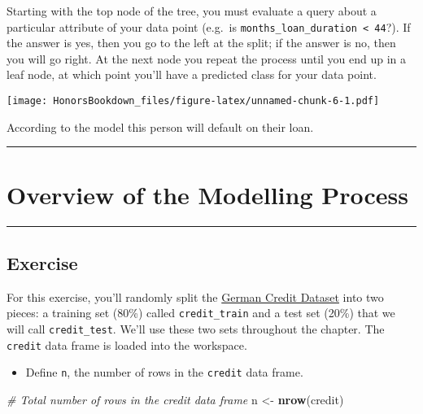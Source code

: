 \documentclass[
]{book}
\newenvironment{Shaded}{\begin{snugshade}}{\end{snugshade}}
\newcommand{\CommentTok}[1]{\textcolor[rgb]{0.56,0.35,0.01}{\textit{#1}}}
\newcommand{\KeywordTok}[1]{\textcolor[rgb]{0.13,0.29,0.53}{\textbf{#1}}}
\newcommand{\NormalTok}[1]{#1}
\newcommand{\StringTok}[1]{\textcolor[rgb]{0.31,0.60,0.02}{#1}}
\providecommand{\tightlist}{%
  \setlength{\itemsep}{0pt}\setlength{\parskip}{0pt}}
\begin{document}
Starting with the top node of the tree, you must evaluate a query about a particular attribute of your data point (e.g.~is \texttt{months\_loan\_duration\ \textless{}\ 44}?). If the answer is yes, then you go to the left at the split; if the answer is no, then you will go right. At the next node you repeat the process until you end up in a leaf node, at which point you'll have a predicted class for your data point.

\texttt{[image: HonorsBookdown\_files/figure-latex/unnamed-chunk-6-1.pdf]}

According to the model this person will default on their loan.

\begin{center}\rule{0.5\linewidth}{0.5pt}\end{center}

\hypertarget{overview-of-the-modelling-process}{%
\section{Overview of the Modelling Process}\label{overview-of-the-modelling-process}}

\begin{center}\rule{0.5\linewidth}{0.5pt}\end{center}

\hypertarget{exercise-1}{%
\subsection*{Exercise}\label{exercise-1}}

For this exercise, you'll randomly split the \href{}{German Credit Dataset} into two pieces: a training set (80\%) called \texttt{credit\_train} and a test set (20\%) that we will call \texttt{credit\_test}. We'll use these two sets throughout the chapter. The \texttt{credit} data frame is loaded into the workspace.

\begin{itemize}
\tightlist
\item
  Define \texttt{n}, the number of rows in the \texttt{credit} data frame.
\end{itemize}

\begin{Shaded}
\begin{Highlighting}[]
\CommentTok{# Total number of rows in the credit data frame}
\NormalTok{n <-}\StringTok{ }\KeywordTok{nrow}\NormalTok{(credit)}
\end{Highlighting}
\end{Shaded}
\end{document}

